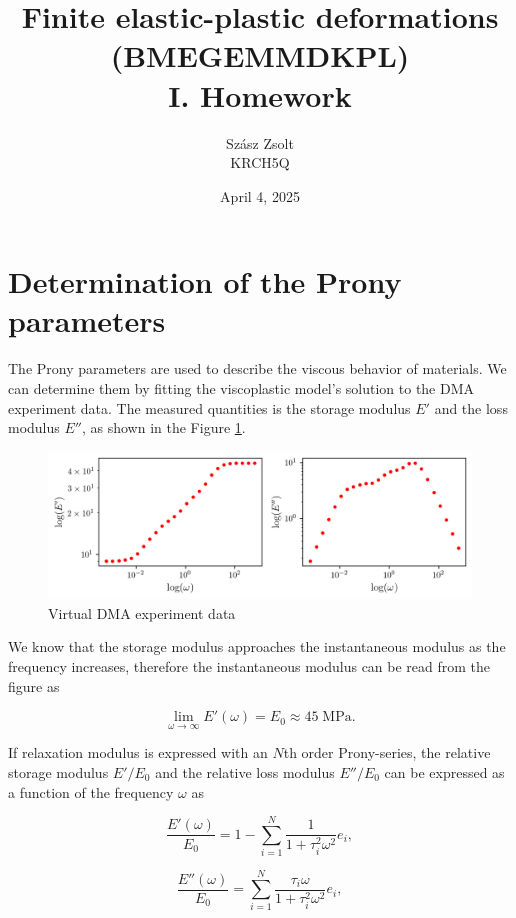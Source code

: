 \documentclass[12pt,a4paper]{article}
\title{Finite elastic-plastic deformations\\(BMEGEMMDKPL)\\I. Homework}
\author{Szász Zsolt\\KRCH5Q}
\date{April 4, 2025}
\begin{document}
\maketitle{}

\newpage

\section{Determination of the Prony parameters}

The Prony parameters are used to describe the viscous behavior of materials. We can determine them by fitting the viscoplastic model's solution to the DMA experiment data. The measured quantities is the storage modulus $E'$ and the loss modulus $E''$, as shown in the Figure \ref{fig:experiment}.


\begin{figure}[h]
    \centering
    \includegraphics[scale=0.875]{figures/data.png}
    \caption{Virtual DMA experiment data}
    \label{fig:experiment}
\end{figure}

We know that the storage modulus approaches the instantaneous modulus as the frequency increases, therefore the instantaneous modulus can be read from the figure as

\begin{equation}
    \lim_{\omega\rightarrow\infty}E'(\omega) = E_0 \approx 45\;\text{MPa}.
\end{equation}

If relaxation modulus is expressed with an $N$th order Prony-series, the relative storage modulus $E'/E_0$ and the relative loss modulus $E''/E_0$ can be expressed as a function of the frequency $\omega$ as

\begin{equation}
\frac{E'(\omega)}{E_0} = 
1 - \sum_{i=1}^N \frac{1}{1+\tau_i^2 \omega^2}e_i,
\end{equation}

\begin{equation}
\frac{E''(\omega)}{E_0} = 
\sum_{i=1}^N \frac{\tau_i \omega}{1+\tau_i^2 \omega^2}e_i,
\end{equation}
\end{document}
